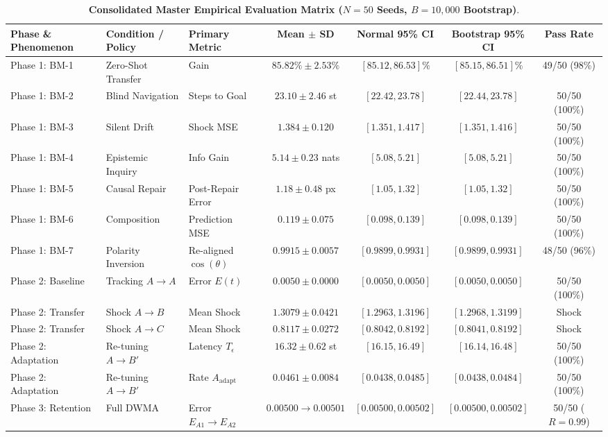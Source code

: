 \documentclass[11pt,a4paper]{article}
\begin{document}
\begin{table}[t]
\centering
\small
\caption{\textbf{Consolidated Master Empirical Evaluation Matrix ($N=50$ Seeds, $B=10,000$ Bootstrap)}.}
\label{tab:master_matrix}
\begin{tabular}{lllcccc}
\toprule
\textbf{Phase \& Phenomenon} & \textbf{Condition / Policy} & \textbf{Primary Metric} & \textbf{Mean $\pm$ SD} & \textbf{Normal 95\% CI} & \textbf{Bootstrap 95\% CI} & \textbf{Pass Rate} \\
\midrule
Phase 1: BM-1 & Zero-Shot Transfer & Gain & $85.82\% \pm 2.53\%$ & $[85.12, 86.53]\%$ & $[85.15, 86.51]\%$ & 49/50 (98\%) \\
Phase 1: BM-2 & Blind Navigation & Steps to Goal & $23.10 \pm 2.46$ st & $[22.42, 23.78]$ & $[22.44, 23.78]$ & 50/50 (100\%) \\
Phase 1: BM-3 & Silent Drift & Shock MSE & $1.384 \pm 0.120$ & $[1.351, 1.417]$ & $[1.351, 1.416]$ & 50/50 (100\%) \\
Phase 1: BM-4 & Epistemic Inquiry & Info Gain & $5.14 \pm 0.23$ nats & $[5.08, 5.21]$ & $[5.08, 5.21]$ & 50/50 (100\%) \\
Phase 1: BM-5 & Causal Repair & Post-Repair Error & $1.18 \pm 0.48$ px & $[1.05, 1.32]$ & $[1.05, 1.32]$ & 50/50 (100\%) \\
Phase 1: BM-6 & Composition & Prediction MSE & $0.119 \pm 0.075$ & $[0.098, 0.139]$ & $[0.098, 0.139]$ & 50/50 (100\%) \\
Phase 1: BM-7 & Polarity Inversion & Re-aligned $\cos(\theta)$ & $0.9915 \pm 0.0057$ & $[0.9899, 0.9931]$ & $[0.9899, 0.9931]$ & 48/50 (96\%) \\
\midrule
Phase 2: Baseline & Tracking $A \to A$ & Error $E(t)$ & $0.0050 \pm 0.0000$ & $[0.0050, 0.0050]$ & $[0.0050, 0.0050]$ & 50/50 (100\%) \\
Phase 2: Transfer & Shock $A \to B$ & Mean Shock & $1.3079 \pm 0.0421$ & $[1.2963, 1.3196]$ & $[1.2968, 1.3199]$ & Shock \\
Phase 2: Transfer & Shock $A \to C$ & Mean Shock & $0.8117 \pm 0.0272$ & $[0.8042, 0.8192]$ & $[0.8041, 0.8192]$ & Shock \\
Phase 2: Adaptation & Re-tuning $A \to B'$ & Latency $T_\epsilon$ & $16.32 \pm 0.62$ st & $[16.15, 16.49]$ & $[16.14, 16.48]$ & 50/50 (100\%) \\
Phase 2: Adaptation & Re-tuning $A \to B'$ & Rate $A_{\text{adapt}}$ & $0.0461 \pm 0.0084$ & $[0.0438, 0.0485]$ & $[0.0438, 0.0484]$ & 50/50 (100\%) \\
\midrule
Phase 3: Retention & Full DWMA & Error $E_{A1} \to E_{A2}$ & $0.00500 \to 0.00501$ & $[0.00500, 0.00502]$ & $[0.00500, 0.00502]$ & 50/50 ($R=0.99$) \\

\end{tabular}
\end{table}
\end{document}
